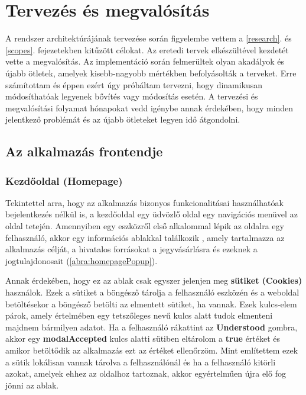 \chapter{Tervezés és megvalósítás}

A rendszer architektúrájának tervezése során figyelembe vettem a \ref{research}. és \ref{scopes}. fejezetekben kitűzött célokat. Az eretedi tervek elkészültével kezdetét vette a megvalósítás. Az implementáció során felmerültek olyan akadályok és újabb ötletek, amelyek kisebb-nagyobb mértékben befolyásolták a terveket. Erre számítottam és éppen ezért úgy próbáltam tervezni, hogy dinamikusan módosíthatóak legyenek bővítés vagy módosítás esetén. A tervezési és megvalósítási folyamat hónapokat vedd igénybe annak érdekében, hogy minden jelentkező problémát és az újabb ötleteket legyen idő átgondolni.

\section {Az alkalmazás frontendje}

\subsection {Kezdőoldal (Homepage)}

Tekintettel arra, hogy az alkalmazás bizonyos funkcionalitásai használhatóak bejelentkezés nélkül is, a kezdőoldal egy üdvözlő oldal egy navigációs menüvel az oldal tetején. Amennyiben egy eszközről első alkalommal lépik az oldalra egy felhasználó, akkor egy információs ablakkal találkozik \cite{Modal}, amely tartalmazza az alkalmazás célját, a hivatalos forrásokat a jegyvásárlásra és ezeknek a jogtulajdonosait (\ref{abra:homepagePopup}).

Annak érdekében, hogy ez az ablak csak egyszer jelenjen meg \textbf{sütiket (Cookies)} használok. Ezek a sütiket a böngésző tárolja a felhasználó eszközén és a weboldal betöltésekor a böngésző betölti az elmentett sütiket, ha vannak. Ezek kulcs-elem párok, amely értelmében egy tetszőleges nevű kulcs alatt tudok elmenteni majdnem bármilyen adatot. Ha a felhasználó rákattint az \textbf{Understood} gombra, akkor egy \textbf{modalAccepted} kulcs alatti sütiben eltárolom a \textbf{true} értéket és amikor betöltődik az alkalmazás ezt az értéket ellenőrzöm.
Mint említettem ezek a sütik lokálisan vannak tárolva a felhasználónál és ha a felhasználó kitörli azokat, amelyek ehhez az oldalhoz tartoznak, akkor egyértelműen újra elő fog jönni az ablak.

